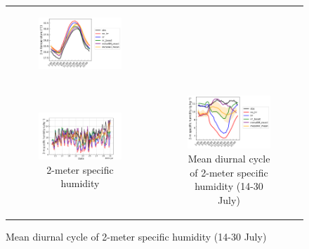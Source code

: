 \begin{figure}[t]
\begin{tabular}{cc}
\begin{subfigure}[t]{0.5\textwidth}
            \includegraphics[width=\textwidth]{images/chap5/SOP_TS_DC/diurnal_cycle_cendrosa_t2m.png}
        \end{subfigure} \\
        \begin{subfigure}[t]{0.5\textwidth}
            \caption{2-meter specific humidity}
            \includegraphics[width=\textwidth]{images/chap5/SOP_TS_DC/time_series_cendrosa_q2m.png}
        \end{subfigure} &
        \begin{subfigure}[t]{0.5\textwidth}
            \caption{Mean diurnal cycle of 2-meter specific humidity (14-30 July)}
            \includegraphics[width=\textwidth]{images/chap5/SOP_TS_DC/diurnal_cycle_cendrosa_q2m.png}

\end{subfigure}
\end{tabular}
\end{figure}
